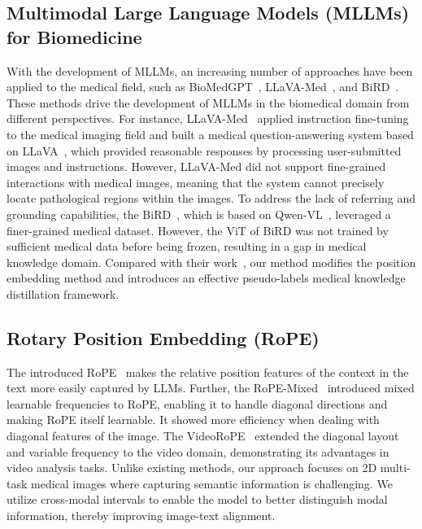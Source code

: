 \subsection{Multimodal Large Language Models (MLLMs) for Biomedicine}
With the development of MLLMs, an increasing number of approaches have been applied to the medical field, such as BioMedGPT~\cite{Zhang_2024}, LLaVA-Med~\cite{li2024llava}, and BiRD~\cite{huang2024BiRD}. These methods drive the development of MLLMs in the biomedical domain from different perspectives. For instance, LLaVA-Med~\cite{li2024llava} applied instruction fine-tuning to the medical imaging field and built a medical question-answering system based on LLaVA~\cite{llava}, which provided reasonable responses by processing user-submitted images and instructions. However, LLaVA-Med did not support fine-grained interactions with medical images, meaning that the system cannot precisely locate pathological regions within the images. To address the lack of referring and grounding capabilities, the BiRD~\cite{huang2024BiRD}, which is based on Qwen-VL~\cite{bai2023qwenvlversatilevisionlanguagemodel}, leveraged a finer-grained medical dataset. However, the ViT of BiRD was not trained by sufficient medical data before being frozen, resulting in a gap in medical knowledge domain. Compared with their work~\cite{huang2024BiRD, li2024llava}, our method modifies the position embedding method and introduces an effective pseudo-labels medical knowledge distillation framework.
\subsection{Rotary Position Embedding (RoPE)}
The introduced RoPE~\cite{su2023roformerenhancedtransformerrotary} makes the relative position features of the context in the text more easily captured by LLMs. Further, the RoPE-Mixed~\cite{heo2024rotarypositionembeddingvision} introduced mixed learnable frequencies to RoPE, enabling it to handle diagonal directions and making RoPE itself learnable. It showed more efficiency when dealing with diagonal features of the image. The VideoRoPE~\cite{wei2025videoropemakesgoodvideo} extended the diagonal layout and variable frequency to the video domain, demonstrating its advantages in video analysis tasks. Unlike existing methods, our approach focuses on 2D multi-task medical images where capturing semantic information is challenging. We utilize cross-modal intervals to enable the model to better distinguish modal information, thereby improving image-text alignment.

